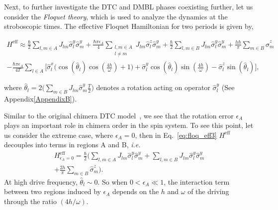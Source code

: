 \documentclass[%
reprint,
superscriptaddress,
amsmath,amssymb,showkeys,
aps,
prb,
]{revtex4-2}
\begin{document}
	Next, to further investigate the DTC and DMBL phases coexisting further, let us consider the \textit{Floquet theory}, which is used to analyze the dynamics at the stroboscopic times. The effective Floquet Hamiltonian for two periods is given by,
	\begin{widetext}
		\begin{multline}
			H^{\mathrm{eff}} \approx\frac{\hbar}{2} \sum_{l,m\in A}J_{lm}\hat{\sigma}_l^y\hat{\sigma}_m^y +\frac{\hbar \pi \epsilon_A}{4} \sum_{\substack{l,m\in A\\l\neq m}} J_{lm}\hat{\sigma}^z_l\hat{\sigma}^y_m + \frac{\hbar}{2}\sum_{l,m\in B}J_{lm}\hat{\sigma}_l^y \hat{\sigma}_m^y + \frac{h\hbar}{\pi}\sum_{m \in B}\hat{\sigma}^z_m \\ -\frac{\hbar \pi \epsilon_A}{4T}\sum_{l\in A}\Bigg[\hat{\sigma}^x_l \Bigg(\cos(\hat{\theta}_l)\cos(\frac{4h}{\omega})+1 \Bigg) + \hat{\sigma}^y_l \cos(\hat{\theta}_l)\sin(\frac{4h}{\omega})-\hat{\sigma}^z_l \sin(\hat{\theta}_l)\Bigg],
			\label{eq:floq_eff3}
		\end{multline}
	\end{widetext}
	where $\displaystyle \hat{\theta}_l = 2 \Big(\sum_{m \in B}J_{lm}\hat{\sigma}^y_m \frac{T}{2} \Big)$ denotes a rotation acting on operator $\hat{\sigma}^y_l$ (See Appendix\ref{AppendixB}).
	
	Similar to the original chimera DTC model~\cite{sakurai_phys_nodate}, we see that the rotation error $\epsilon_A$ plays an important role in chimera order in the spin system. To see this point, let us consider the extreme case, where $\epsilon_A=0$, then in Eq.~\eqref{eq:floq_eff3}  $H^\mathrm{eff}$ decouples into terms in regions A and B, \textit{i.e.}
	\begin{multline}
		H^{\mathrm{eff}}_{\epsilon_A=0} =  \frac{\hbar}{2}\Bigg( \sum_{l,m\in A} J_{lm} \hat{\sigma}^y_l\hat{\sigma}^y_m +\sum_{l,m\in B} J_{lm} \hat{\sigma}^y_l\hat{\sigma}^y_m\\+\frac{2h }{\pi}\sum_{m \in B}\hat{\sigma}^z_m\Bigg).
	\end{multline}
	At high drive  frequency, $\hat{\theta}_l \sim 0$. So when $0<\epsilon_A \ll 1$, the interaction term between two regions induced by $\epsilon_A$ depends on the $h$ and $\omega$ of the driving through the ratio $(4h/\omega)$. 
	
\end{document}
